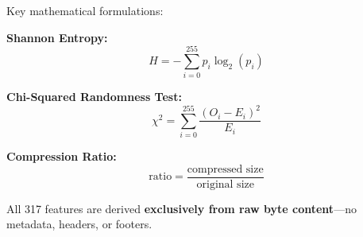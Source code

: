 \documentclass[12pt,a4paper]{report}
\begin{document}
\begin{normalsize}
{Key mathematical formulations:

\textbf{Shannon Entropy:}
\begin{equation}
    H = -\sum_{i=0}^{255} p_i \log_2(p_i)
\end{equation}

\textbf{Chi-Squared Randomness Test:}
\begin{equation}
    \chi^2 = \sum_{i=0}^{255} \frac{(O_i - E_i)^2}{E_i}
\end{equation}

\textbf{Compression Ratio:}
\begin{equation}
    \text{ratio} = \frac{\text{compressed size}}{\text{original size}}
\end{equation}

All 317 features are derived \textbf{exclusively from raw byte content}---no metadata, headers, or footers.
\par}

\end{normalsize}

\newpage
\end{document}
